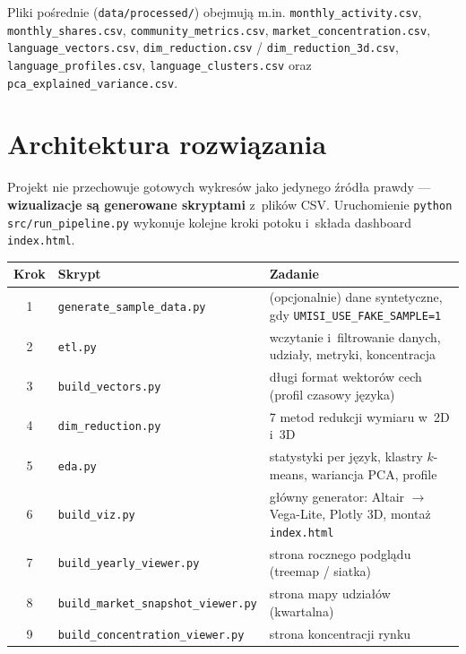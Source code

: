\documentclass[11pt,a4paper]{article}
\begin{document}
Pliki pośrednie (\texttt{data/processed/}) obejmują m.in. \texttt{monthly\_activity.csv},
\texttt{monthly\_shares.csv}, \texttt{community\_metrics.csv},
\texttt{market\_concentration.csv}, \texttt{language\_vectors.csv},
\texttt{dim\_reduction.csv} / \texttt{dim\_reduction\_3d.csv},
\texttt{language\_profiles.csv}, \texttt{language\_clusters.csv} oraz
\texttt{pca\_explained\_variance.csv}.

\section{Architektura rozwiązania}

Projekt nie przechowuje gotowych wykresów jako jedynego źródła prawdy --- \textbf{wizualizacje
są generowane skryptami} z~plików CSV. Uruchomienie \texttt{python src/run\_pipeline.py}
wykonuje kolejne kroki potoku i~składa dashboard \texttt{index.html}.

\begin{center}
\begin{tabular}{@{}clp{9.5cm}@{}}
\toprule
\textbf{Krok} & \textbf{Skrypt} & \textbf{Zadanie} \\
\midrule
1 & \texttt{generate\_sample\_data.py} & (opcjonalnie) dane syntetyczne, gdy \texttt{UMISI\_USE\_FAKE\_SAMPLE=1} \\
2 & \texttt{etl.py} & wczytanie i~filtrowanie danych, udziały, metryki, koncentracja \\
3 & \texttt{build\_vectors.py} & długi format wektorów cech (profil czasowy języka) \\
4 & \texttt{dim\_reduction.py} & 7 metod redukcji wymiaru w~2D i~3D \\
5 & \texttt{eda.py} & statystyki per język, klastry $k$-means, wariancja PCA, profile \\
6 & \texttt{build\_viz.py} & główny generator: Altair $\rightarrow$ Vega-Lite, Plotly 3D, montaż \texttt{index.html} \\
7 & \texttt{build\_yearly\_viewer.py} & strona rocznego podglądu (treemap / siatka) \\
8 & \texttt{build\_market\_snapshot\_viewer.py} & strona mapy udziałów (kwartalna) \\
9 & \texttt{build\_concentration\_viewer.py} & strona koncentracji rynku \\
\bottomrule
\end{tabular}
\end{center}
\end{document}
